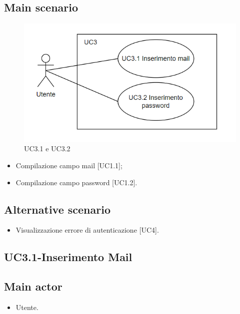 \documentclass{article}
\begin{document}
    \subsection*{Main scenario}
        \begin{figure}[h]
            \centering
            \includegraphics{documenti/imgUML/UC3-SOTTOCASI.png}
            \caption{UC3.1 e UC3.2}
            \label{fig:UC3 SOTTOCASI}
        \end{figure}
        \begin{itemize}
            \item Compilazione campo mail [UC1.1];
            \item Compilazione campo password [UC1.2].
        \end{itemize}
            
        \subsection*{Alternative scenario}
            \begin{itemize}
                \item Visualizzazione errore di autenticazione [UC4].
            \end{itemize}
            
\subsection{UC3.1-Inserimento Mail}
    
     \subsection*{Main actor}
         \begin{itemize}
             \item Utente.
         \end{itemize}
\end{document}
